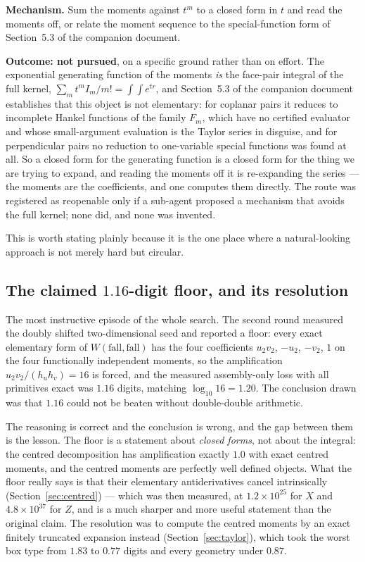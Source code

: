 \documentclass[11pt]{article}
\theoremstyle{remark}
\begin{document}
\textbf{Mechanism.} Sum the moments against $t^m$ to a closed form in $t$ and read the
moments off, or relate the moment sequence to the special-function form of Section~5.3 of
the companion document.

\textbf{Outcome: not pursued}, on a specific ground rather than on effort. The exponential
generating function of the moments \emph{is} the face-pair integral of the full kernel,
$\sum_m t^m I_m/m! = \int\!\int e^{tr}$, and Section~5.3 of the companion document
establishes that this object is not elementary: for coplanar pairs it reduces to
incomplete Hankel functions of the family $F_m$, which have no certified evaluator and
whose small-argument evaluation is the Taylor series in disguise, and for perpendicular
pairs no reduction to one-variable special functions was found at all. So a closed form for
the generating function is a closed form for the thing we are trying to expand, and reading
the moments off it is re-expanding the series --- the moments are the coefficients, and one
computes them directly. The route was registered as reopenable only if a sub-agent proposed
a mechanism that avoids the full kernel; none did, and none was invented.

This is worth stating plainly because it is the one place where a natural-looking approach
is not merely hard but circular.

\subsection{The claimed $1.16$-digit floor, and its resolution}

The most instructive episode of the whole search. The second round measured the doubly
shifted two-dimensional seed and reported a floor: every exact elementary form of
$W(\text{fall},\text{fall})$ has the four coefficients $u_2v_2$, $-u_2$, $-v_2$, $1$ on the
four functionally independent moments, so the amplification $u_2v_2/(h_uh_v) = 16$ is
forced, and the measured assembly-only loss with all primitives exact was $1.16$ digits,
matching $\log_{10} 16 = 1.20$. The conclusion drawn was that $1.16$ could not be beaten
without double-double arithmetic.

The reasoning is correct and the conclusion is wrong, and the gap between them is the
lesson. The floor is a statement about \emph{closed forms}, not about the integral: the
centred decomposition has amplification exactly $1.0$ with exact centred moments, and the
centred moments are perfectly well defined objects. What the floor really says is that
their elementary antiderivatives cancel intrinsically (Section~\ref{sec:centred}) --- which
was then measured, at $1.2\times10^{25}$ for $X$ and $4.8\times10^{37}$ for $Z$, and is a
much sharper and more useful statement than the original claim. The resolution was to
compute the centred moments by an exact finitely truncated expansion instead
(Section~\ref{sec:taylor}), which took the worst box type from $1.83$ to $0.77$ digits and
every geometry under $0.87$.
\end{document}
